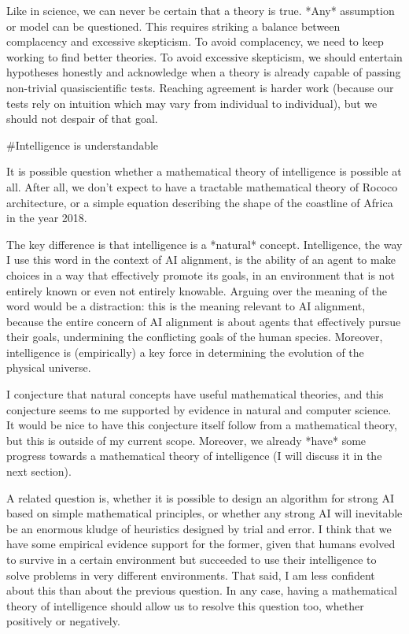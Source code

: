 \documentclass[a4paper]{article}
\begin{document}
Like in science, we can never be certain that a theory is true. *Any* assumption or model can be questioned. This requires striking a balance between complacency and excessive skepticism. To avoid complacency, we need to keep working to find better theories. To avoid excessive skepticism, we should entertain hypotheses honestly and acknowledge when a theory is already capable of passing non-trivial quasiscientific tests. Reaching agreement is harder work (because our tests rely on intuition which may vary from individual to individual), but we should not despair of that goal.

\#Intelligence is understandable

It is possible question whether a mathematical theory of intelligence is possible at all. After all, we don't expect to have a tractable mathematical theory of Rococo architecture, or a simple equation describing the shape of the coastline of Africa in the year 2018.

The key difference is that intelligence is a *natural* concept. Intelligence, the way I use this word in the context of AI alignment, is the ability of an agent to make choices in a way that effectively promote its goals, in an environment that is not entirely known or even not entirely knowable. Arguing over the meaning of the word would be a distraction: this is the meaning relevant to AI alignment, because the entire concern of AI alignment is about agents that effectively pursue their goals, undermining the conflicting goals of the human species. Moreover, intelligence is (empirically) a key force in determining the evolution of the physical universe.

I conjecture that natural concepts have useful mathematical theories, and this conjecture seems to me supported by evidence in natural and computer science. It would be nice to have this conjecture itself follow from a mathematical theory, but this is outside of my current scope. Moreover, we already *have* some progress towards a mathematical theory of intelligence (I will discuss it in the next section).

A related question is, whether it is possible to design an algorithm for strong AI based on simple mathematical principles, or whether any strong AI will inevitable be an enormous kludge of heuristics designed by trial and error. I think that we have some empirical evidence support for the former, given that humans evolved to survive in a certain environment but succeeded to use their intelligence to solve problems in very different environments. That said, I am less confident about this than about the previous question. In any case, having a mathematical theory of intelligence should allow us to resolve this question too, whether positively or negatively.
\end{document}
